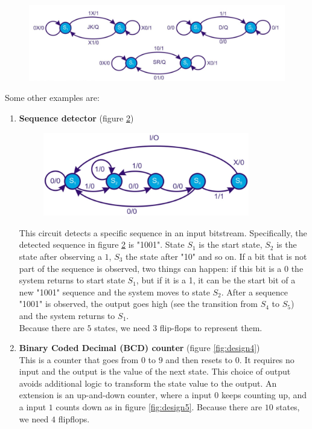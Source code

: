 \begin{figure}[h!]
	\centering
	\includegraphics[width=12cm]{figures/ch17/design2.jpg}
	\caption{}
	\label{fig:design2}
\end{figure}

Some other examples are:
\begin{enumerate}
	\item \textbf{Sequence detector} (figure \ref{fig:design3})\\
		\begin{figure}[h!]
			\centering
			\includegraphics[width=9cm]{figures/ch17/design3.jpg}
			\caption{}
			\label{fig:design3}
		\end{figure}
		This circuit detects a specific sequence in an input bitstream. Specifically, the detected sequence in figure \ref{fig:design3} is "1001". State $S_1$ is the start state, $S_2$ is the state after observing a $1$, $S_3$ the state after "10" and so on. If a bit that is not part of the sequence is observed, two things can happen: if this bit is a 0 the system returns to start state $S_1$, but if it is a 1, it can be the start bit of a new "1001" sequence and the system moves to state $S_2$. After a sequence "1001" is observed, the output goes high (see the transition from $S_4$ to $S_5$) and the system returns to $S_1$.\\
		Because there are $5$ states, we need $3$ flip-flops to represent them.
	\item \textbf{Binary Coded Decimal (BCD) counter} (figure \ref{fig:design4})\\
	This is a counter that goes from $0$ to $9$ and then resets to $0$.  It requires no input and the output is the value of the next state. This choice of output avoids additional logic to transform the state value to the output. An extension is an up-and-down counter, where a input $0$ keeps counting up, and a input $1$ counts down as in figure \ref{fig:design5}. Because there are $10$ states, we need $4$ flipflops.\\

\end{enumerate}
